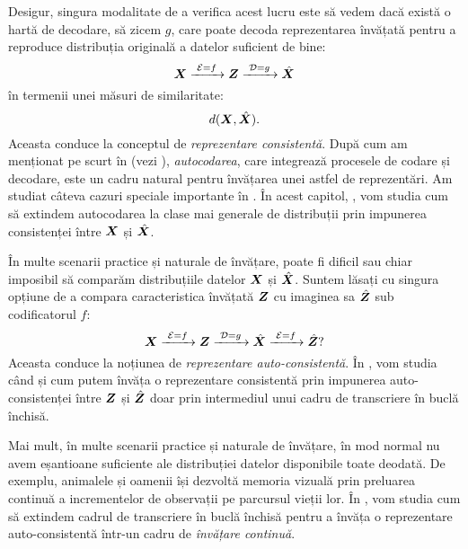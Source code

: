 \documentclass[../../book-main_ro.tex]{subfiles}
\begin{document}
Desigur, singura modalitate de a verifica acest lucru este să vedem dacă există o hartă de decodare, să zicem $g$, care poate decoda reprezentarea învățată pentru a reproduce distribuția originală a datelor suficient de bine:
\begin{equation}
  \bm{X}
  \xrightarrow{\hspace{1mm} \mathcal{E} = f \hspace{1mm}} \bm{Z}
  \xrightarrow{\hspace{1mm} \mathcal{D} = g \hspace{1mm}} \hat{\bm{X}}
\end{equation}
în termenii unei măsuri de similaritate:
\begin{equation}
  d(\bm{X}, \hat {\bm{X}}).
\end{equation}
Aceasta conduce la conceptul de {\em reprezentare consistentă}. După cum am menționat pe scurt în
 (vezi ), {\em autocodarea}, care integrează
procesele de codare și decodare, este un cadru natural pentru învățarea unei astfel de reprezentări. Am studiat câteva cazuri speciale importante în . În
acest capitol, , vom studia cum să extindem autocodarea la clase mai generale de distribuții prin impunerea consistenței între $\bm{X}$ și $\hat {\bm{X}}$.

În multe scenarii practice și naturale de învățare, poate fi dificil sau chiar imposibil să comparăm distribuțiile datelor $\bm{X}$ și $\hat {\bm{X}}$. Suntem lăsați cu singura opțiune de a compara caracteristica învățată $\bm{Z}$ cu imaginea sa $\hat {\bm{Z}}$ sub codificatorul $f$:
\begin{equation}
 \bm{X}
\xrightarrow{\hspace{1mm} \mathcal{E} = f \hspace{1mm}} \bm{Z}  \xrightarrow{\hspace{1mm} \mathcal{D} = g \hspace{1mm}} \hat{\bm{X}} \xrightarrow{\hspace{1mm} \mathcal{E} = f \hspace{1mm}} \hat {\bm{Z}}?
\end{equation}
Aceasta conduce la noțiunea de {\em reprezentare auto-consistentă}. În , vom studia când și cum putem învăța o reprezentare consistentă prin impunerea auto-consistenței între $\bm{Z}$ și $\hat {\bm{Z}}$ doar prin intermediul unui cadru de transcriere în buclă închisă.

Mai mult, în multe scenarii practice și naturale de învățare, în mod normal nu avem eșantioane suficiente ale distribuției datelor disponibile toate deodată. De exemplu, animalele și oamenii își dezvoltă memoria vizuală prin preluarea continuă a incrementelor de observații pe parcursul vieții lor. În , vom studia cum să extindem cadrul de transcriere în buclă închisă pentru a învăța o reprezentare auto-consistentă într-un cadru de {\em învățare continuă}.
\end{document}
